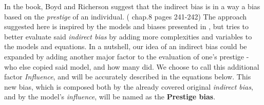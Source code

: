 \documentclass[11pt]{article}
\begin{document}
 In the book, Boyd and Richerson suggest that the indirect bias is in a way a bias based on the \textit{prestige} of an individual. (\cite{evolutionBook} chap.8 pages 241-242)
 The approach suggested here is inspired by the models and biases presented in \cite{evolutionBook}, but tries to better evaluate said \textit{indirect bias} by adding more complexities and variables to the models and equations.
 In a nutshell, our idea of an indirect bias could be expanded by adding another major factor to the evaluation of one's prestige - who else copied said model, and how many did. We choose to call this additional factor \textit{Influence}, and will be accurately described in the equations below.
 This new bias, which is composed both by the already covered original \textit{indirect bias}, and by the model's \textit{influence}, will be named as the \textbf{Prestige bias}.
\end{document}
